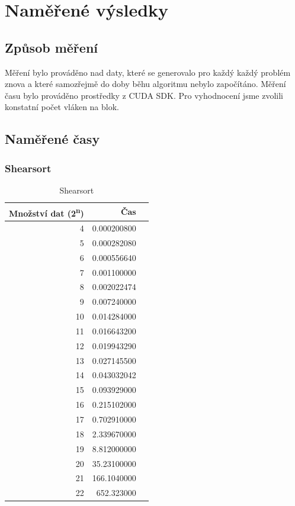\documentclass[12pt]{article}
\begin{document}
\section{Naměřené výsledky}
\subsection{Způsob měření}
Měření bylo prováděno nad daty, které se generovalo pro každý každý problém znova a které samozřejmě do doby běhu algoritmu nebylo započítáno. Měření času bylo prováděno prostředky z CUDA SDK. Pro vyhodnocení jsme zvolili konstatní počet vláken na blok.

\subsection{Naměřené časy}
\subsubsection{Shearsort}
\begin{table}[H]
\begin{center}
\begin{tabular}{|r|r|r|}
\hline Množství dat (2\textsuperscript{n}) & Čas \\ \hline

4       &  0.000200800 \\ \hline
5       &  0.000282080 \\ \hline
6       &  0.000556640 \\ \hline
7       &  0.001100000 \\ \hline
8       &  0.002022474 \\ \hline
9       &  0.007240000\\ \hline
10      &  0.014284000 \\ \hline
11      &  0.016643200 \\ \hline
12      &  0.019943290 \\ \hline
13      &  0.027145500 \\ \hline
14      &  0.043032042 \\ \hline
15      &  0.093929000 \\ \hline
16      &  0.215102000 \\ \hline
17      &  0.702910000 \\ \hline
18      &  2.339670000 \\ \hline
19      &  8.812000000 \\ \hline
20      &  35.23100000 \\ \hline
21      &  166.1040000 \\ \hline
22	&  652.323000  \\ \hline

\end{tabular} 
\end{center}
\caption{Shearsort}
\end{table} 
\end{document}
